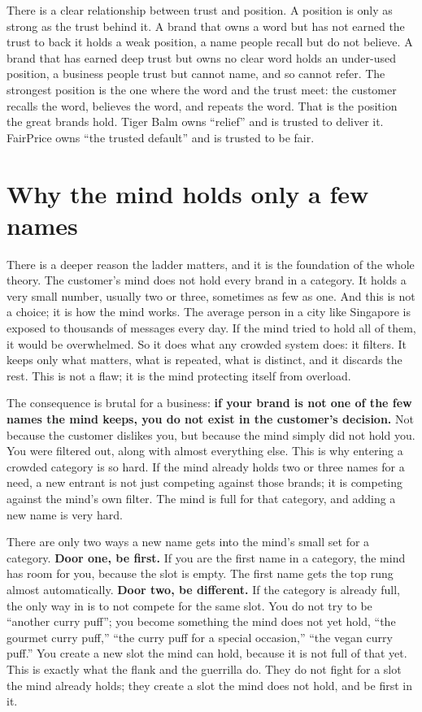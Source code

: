 \documentclass[10pt,twoside,openany]{memoir}
\newcommand{\needspacehead}{\needspace{4\baselineskip}}
\let\oldsection\section
\renewcommand{\section}{\needspacehead\oldsection}
\begin{document}
There is a clear relationship between trust and position. A position is
only as strong as the trust behind it. A brand that owns a word but has
not earned the trust to back it holds a weak position, a name people
recall but do not believe. A brand that has earned deep trust but owns
no clear word holds an under-used position, a business people trust but
cannot name, and so cannot refer. The strongest position is the one
where the word and the trust meet: the customer recalls the word,
believes the word, and repeats the word. That is the position the great
brands hold. Tiger Balm owns ``relief'' and is trusted to deliver it.
FairPrice owns ``the trusted default'' and is trusted to be fair.

\section{Why the mind holds only a few
names}\label{why-the-mind-holds-only-a-few-names}

There is a deeper reason the ladder matters, and it is the foundation of
the whole theory. The customer's mind does not hold every brand in a
category. It holds a very small number, usually two or three, sometimes
as few as one. And this is not a choice; it is how the mind works. The
average person in a city like Singapore is exposed to thousands of
messages every day. If the mind tried to hold all of them, it would be
overwhelmed. So it does what any crowded system does: it filters. It
keeps only what matters, what is repeated, what is distinct, and it
discards the rest. This is not a flaw; it is the mind protecting itself
from overload.

The consequence is brutal for a business: \textbf{if your brand is not
one of the few names the mind keeps, you do not exist in the customer's
decision.} Not because the customer dislikes you, but because the mind
simply did not hold you. You were filtered out, along with almost
everything else. This is why entering a crowded category is so hard. If
the mind already holds two or three names for a need, a new entrant is
not just competing against those brands; it is competing against the
mind's own filter. The mind is full for that category, and adding a new
name is very hard.

There are only two ways a new name gets into the mind's small set for a
category. \textbf{Door one, be first.} If you are the first name in a
category, the mind has room for you, because the slot is empty. The
first name gets the top rung almost automatically. \textbf{Door two, be
different.} If the category is already full, the only way in is to not
compete for the same slot. You do not try to be ``another curry puff'';
you become something the mind does not yet hold, ``the gourmet curry
puff,'' ``the curry puff for a special occasion,'' ``the vegan curry
puff.'' You create a new slot the mind can hold, because it is not full
of that yet. This is exactly what the flank and the guerrilla do. They
do not fight for a slot the mind already holds; they create a slot the
mind does not hold, and be first in it.
\end{document}
